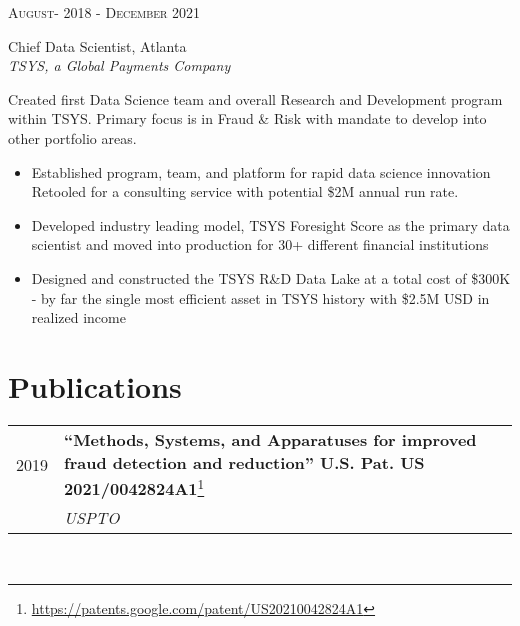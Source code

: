 \documentclass[10pt]{article} %
\begin{document}
\begin{minipage}[t]{0.5\textwidth}
{\raggedleft\textsc{August- 2018 - December 2021}\par}

{\raggedright\large Chief Data Scientist, Atlanta\\ 
\textit{TSYS, a Global Payments Company}\\[5pt]}

\normalsize{Created first Data Science team and overall Research and Development program within TSYS. Primary focus is in Fraud \& Risk with mandate to develop into other portfolio areas. \\
\begin{itemize}
\item Established program, team, and platform for rapid data science innovation Retooled for a consulting service with potential \$2M annual run rate.  
\item Developed industry leading model, TSYS Foresight Score as the primary data scientist and moved into production for 30+ different financial institutions
\item Designed and constructed the TSYS R\&D Data Lake at a total cost of \$300K - by far the single most efficient asset in TSYS history with \$2.5M USD in realized income
\end{itemize}}







\section{Publications} 

\begin{tabular}{rl}
2019 & \parbox{0.75\textwidth}{\textbf{“Methods, Systems, and Apparatuses for improved fraud detection and reduction” U.S. Pat. US 2021/0042824A1}\footnote{\url{https://patents.google.com/patent/US20210042824A1}}}\\
& \textit{USPTO} \\
\end{tabular}\\[10pt]
\end{minipage} %
\hfill
\end{document}
